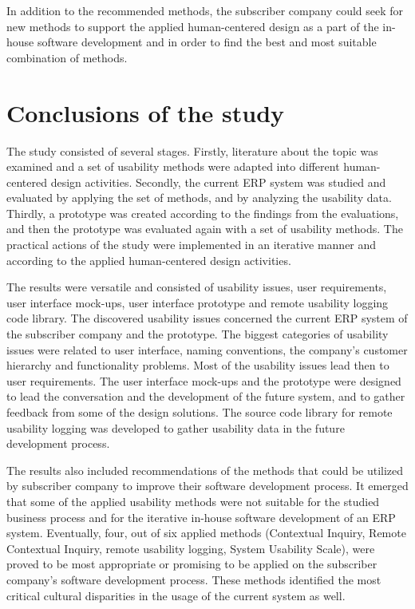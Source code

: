 \documentclass[12pt,a4paper,oneside,pdftex]{report}
\begin{document}
In addition to the recommended methods, the subscriber company could seek for new methods to support the applied human-centered design as a part of the in-house software development and in order to find the best and most suitable combination of methods.
 


\section{Conclusions of the study}
The study consisted of several stages. Firstly, literature about the topic was examined and a set of usability methods were adapted into different human-centered design activities. Secondly, the current ERP system was studied and evaluated by applying the set of methods, and by analyzing the usability data. Thirdly, a prototype was created according to the findings from the evaluations, and then the prototype was evaluated again with a set of usability methods. The practical actions of the study were implemented in an iterative manner and according to the applied human-centered design activities.

The results were versatile and consisted of usability issues, user requirements, user interface mock-ups, user interface prototype and remote usability logging code library. The discovered usability issues concerned the current ERP system of the subscriber company and  the prototype. The biggest categories of usability issues were related to user interface, naming conventions, the company's customer hierarchy and functionality problems. Most of the usability issues lead then to user requirements. The user interface mock-ups and the prototype were designed to lead the conversation and the development of the future system, and to gather feedback from some of the design solutions. The source code library for remote usability logging was developed to gather usability data in the future development process.  

The results also included recommendations of the methods that could be utilized by subscriber company to improve their software development process. It emerged that some of the applied usability methods were not suitable for the studied business process and for the iterative in-house software development of an ERP system. Eventually, four, out of six applied methods (Contextual Inquiry, Remote Contextual Inquiry, remote usability logging, System Usability Scale), were proved to be most appropriate or promising to be applied on the subscriber company's software development process. These methods identified the most critical cultural disparities in the usage of the current system as well.
\end{document}
